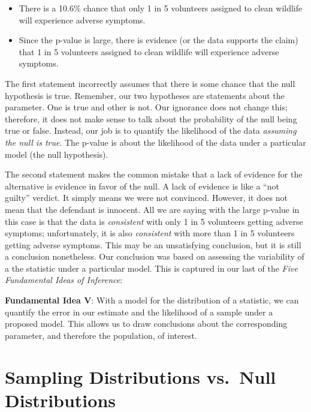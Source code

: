 \documentclass[]{book}
\providecommand{\tightlist}{%
  \setlength{\itemsep}{0pt}\setlength{\parskip}{0pt}}
\theoremstyle{definition}
\theoremstyle{definition}
\theoremstyle{remark}
\let\BeginKnitrBlock\begin \let\EndKnitrBlock\end
\begin{document}
\begin{itemize}
\tightlist
\item
  There is a 10.6\% chance that only 1 in 5 volunteers assigned to clean
  wildlife will experience adverse symptoms.
\item
  Since the p-value is large, there is evidence (or the data supports
  the claim) that 1 in 5 volunteers assigned to clean wildlife will
  experience adverse symptoms.
\end{itemize}

The first statement incorrectly assumes that there is some chance that
the null hypothesis is true. Remember, our two hypotheses are statements
about the parameter. One is true and other is not. Our ignorance does
not change this; therefore, it does not make sense to talk about the
probability of the null being true or false. Instead, our job is to
quantify the likelihood of the data \emph{assuming the null is true}.
The p-value is about the likelihood of the data under a particular model
(the null hypothesis).

The second statement makes the common mistake that a lack of evidence
for the alternative is evidence in favor of the null. A lack of evidence
is like a ``not guilty'' verdict. It simply means we were not convinced.
However, it does not mean that the defendant is innocent. All we are
saying with the large p-value in this case is that the data is
\emph{consistent} with only 1 in 5 volunteers getting adverse symptoms;
unfortunately, it is also \emph{consistent} with more than 1 in 5
volunteers getting adverse symptoms. This may be an unsatisfying
conclusion, but it is still a conclusion nonetheless. Our conclusion was
based on assessing the variability of a the statistic under a particular
model. This is captured in our last of the \emph{Five Fundamental Ideas
of Inference}:

\BeginKnitrBlock{rmdfivefund}
\textbf{Fundamental Idea V}: With a model for the distribution of a
statistic, we can quantify the error in our estimate and the likelihood
of a sample under a proposed model. This allows us to draw conclusions
about the corresponding parameter, and therefore the population, of
interest.
\EndKnitrBlock{rmdfivefund}

\section{Sampling Distributions vs.~Null
Distributions}\label{sampling-distributions-vs.null-distributions}
\end{document}
